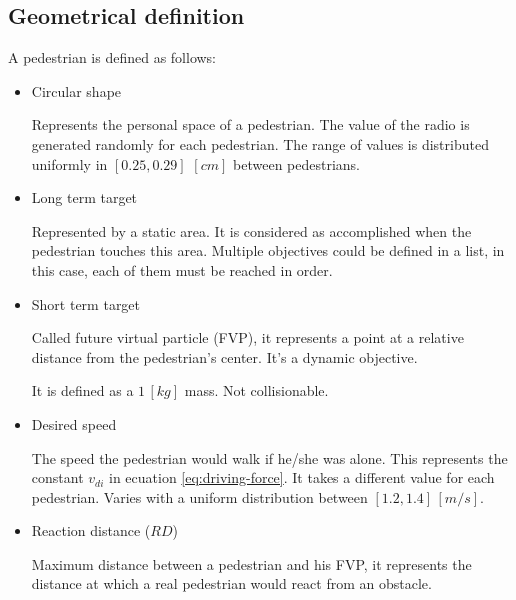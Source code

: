 \documentclass[english]{article}
\begin{document}
    \subsection{Geometrical definition}
    
    A pedestrian is defined as follows: 
    
    \begin{itemize}
        \item Circular shape
        
        Represents the personal space of a pedestrian. The value of the radio
        is generated randomly for each pedestrian. The range of values is
        distributed uniformly in $[0.25,0.29]$ $[cm]$ between pedestrians.
        
        \item Long term target
        
        Represented by a static area. It is considered as accomplished when
        the pedestrian touches this area. Multiple objectives could be defined
        in a list, in this case, each of them must be reached in order.
        
        \item Short term target
        
        Called future virtual particle (FVP), it represents a point at a relative
        distance from the pedestrian's center. It's a dynamic objective.
        
        It is defined as a $1\,[kg]$ mass. Not collisionable.
        
        \item Desired speed
        
        The speed the pedestrian would walk if he/she was alone. This represents
        the constant $v_{di}$ in ecuation \ref{eq:driving-force}. It takes
        a different value for each pedestrian. Varies with a uniform distribution
        between $[1.2,1.4]\,[m/s]$.
        
        \item Reaction distance ($RD$)
        
        
        Maximum distance between a pedestrian and his FVP, it represents the
        distance at which a real pedestrian would react from an obstacle.
    
    \end{itemize}
    
    \vspace{1cm}
    
\end{document}
